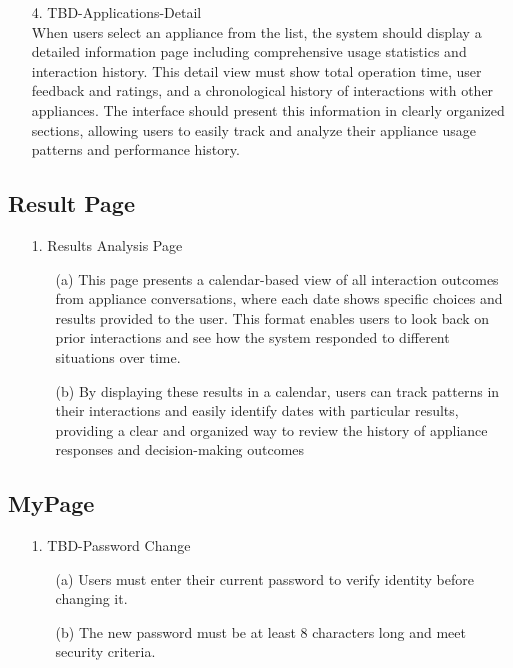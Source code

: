 \documentclass[conference]{IEEEtran}
\begin{document}
\begin{enumerate}
\begin{itemize}
\begin{itemize}
    \begin{enumerate}
        \item[4.] TBD-Applications-Detail \\
        When users select an appliance from the list, the system should display a detailed information page including comprehensive usage statistics and interaction history. This detail view must show total operation time, user feedback and ratings, and a chronological history of interactions with other appliances. The interface should present this information in clearly organized sections, allowing users to easily track and analyze their appliance usage patterns and performance history. \\
    \end{enumerate}

\subsection{Result Page}
    \begin{enumerate}
        \item[1.] Results Analysis Page
        \begin{enumerate}
            \item[(a)] This page presents a calendar-based view of all interaction outcomes from appliance conversations, where each date shows specific choices and results provided to the user. This format enables users to look back on prior interactions and see how the system responded to different situations over time.
            \item[(b)] By displaying these results in a calendar, users can track patterns in their interactions and easily identify dates with particular results, providing a clear and organized way to review the history of appliance responses and decision-making outcomes
        \end{enumerate}
    \end{enumerate}

        
\subsection{MyPage}

    \begin{enumerate}    
        \item[1.] TBD-Password Change
        \begin{enumerate}
            \item[(a)] Users must enter their current password to verify identity before changing it.
            \item[(b)] The new password must be at least 8 characters long and meet security criteria. \\
        \end{enumerate}
    \end{enumerate}


\end{itemize}
\end{itemize}
\end{enumerate}
\end{document}

